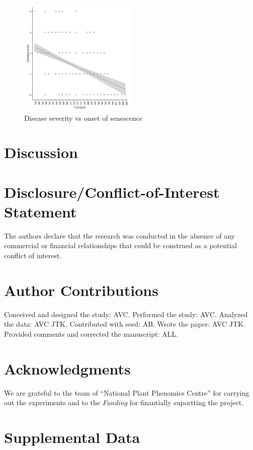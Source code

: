 \documentclass{frontiersSCNS} %
\begin{document}
\begin{figure}[!ht]
  \centering
    \includegraphics[width=0.5\textwidth]{s_d.png}
  \caption{Disease severity vs onset of senescence}
\end{figure}

\section{Discussion}



\section*{Disclosure/Conflict-of-Interest Statement}


The authors declare that the research was conducted in the absence of any commercial or financial relationships that could be construed as a potential conflict of interest.

\section*{Author Contributions}

Conceived and designed the study: AVC. Performed the study: AVC. Analyzed the data: AVC JTK. Contributed with seed: AB. Wrote the paper: AVC JTK. Provided comments and corrected the manuscript: ALL.

\section*{Acknowledgments}
 We are grateful to the team of “National Plant Phenomics Centre” for carrying out the experiments and to the 
\textit{Funding\textcolon} for finantially suportting the project.

\section*{Supplemental Data}
\end{document}
